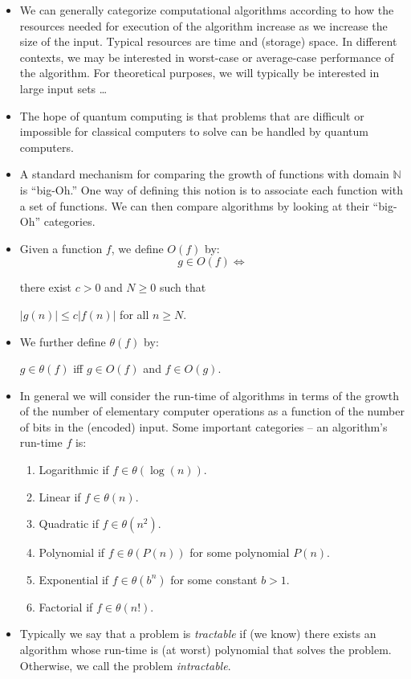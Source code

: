 \documentclass{article}
\def\pagedone{\newpage}
\begin{document}
\begin{itemize}
	\item We can generally categorize computational algorithms according to how the resources needed for execution of the algorithm increase as we increase the size of the input.  Typical resources are time and (storage) space.  In different contexts, we may be interested in worst-case or average-case performance of the algorithm.  For theoretical purposes, we will typically be interested in large input sets \ldots
	\item The hope of quantum computing is that problems that are difficult or impossible for classical computers to solve can be handled by quantum computers.
\pagedone
	\item A standard mechanism for comparing the growth of functions with domain $\mathbb{N}$ is ``big-Oh.''  One way of defining this notion is to associate each function with a set of functions.  We can then compare algorithms by looking at their ``big-Oh'' categories.  
	\item Given a function $f$, we define $O(f)$ by:
$$ g \in O(f) \iff $$
\centerline{there exist $c > 0$ and $N \ge 0$ such that}
\centerline{$\vert g(n) \vert \le c\vert f(n) \vert $ for all $n \ge N$.}
	\item We further define $\theta(f)$ by:
	
\centerline{$g \in \theta(f)$ iff $g \in O(f)$ and $f \in O(g)$.}
\pagedone
	\item In general we will consider the run-time of algorithms in terms of the growth of the number of elementary computer operations as a function of the number of bits in the (encoded) input.  Some important categories -- an algorithm's run-time $f$ is:
	
	\begin{enumerate}
		\item Logarithmic if $f \in \theta(\log(n))$.	
		\item Linear if $f \in \theta(n)$.	
		\item Quadratic if $f \in \theta(n^2)$.	
		\item Polynomial if $f \in \theta(P(n))$ for some polynomial $P(n)$.	
		\item Exponential if $f \in \theta(b^n)$ for some constant $b > 1$.	
		\item Factorial if $f \in \theta(n!)$.
	
	\end{enumerate}
\pagedone
	\item Typically we say that a problem is {\em tractable} if (we know) there exists an algorithm whose run-time is (at worst) polynomial that solves the problem.  Otherwise, we call the problem {\em intractable}.


\end{itemize}
\end{document}
